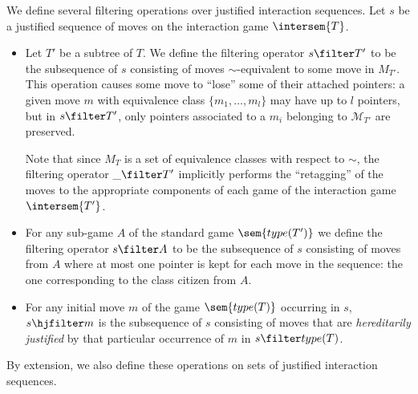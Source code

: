 \begin{definition}[Filtering] We define several filtering operations
over justified interaction sequences. Let $s$ be a justified
sequence of moves on the interaction game $\intersem{T}$.
\begin{itemize}
\item  Let $T'$ be a subtree of $T$. We define the
filtering operator $s\filter T'$ to be the subsequence
of $s$ consisting of moves $\sim$-equivalent to some move in
$M_{T'}$. This operation causes some move to ``lose'' some of
their attached pointers: a given move $m$ with equivalence class
$\{m_1, \ldots, m_l \}$ may have up to $l$ pointers, but in
$s\filter T'$, only pointers associated to a $m_i$
belonging to $\mathcal{M}_{T'}$ are preserved.

Note that since $M_T$ is a set of equivalence classes with
respect to $\sim$, the filtering operator $\_ \filter T'$
implicitly performs the ``retagging'' of the moves to the
appropriate components of each game of the interaction game
$\intersem{T'}$.

\item  For any sub-game $A$ of the standard game $\sem{type(T')}$ we
define the filtering operator $s\filter A$ to be the
subsequence of $s$ consisting of moves from $A$ where at most
one pointer is kept for each move in the sequence: the one
corresponding to the class citizen from $A$.

\item For any initial move $m$ of the game $\sem{type(T)}$ occurring in $s$, $s
\hjfilter m$ is the subsequence of $s$ consisting of moves
that are \emph{hereditarily justified} by that particular occurrence of $m$ in $s \filter type(T)$.

\end{itemize}
By extension, we also define these operations on sets of justified
interaction sequences.
\end{definition}

